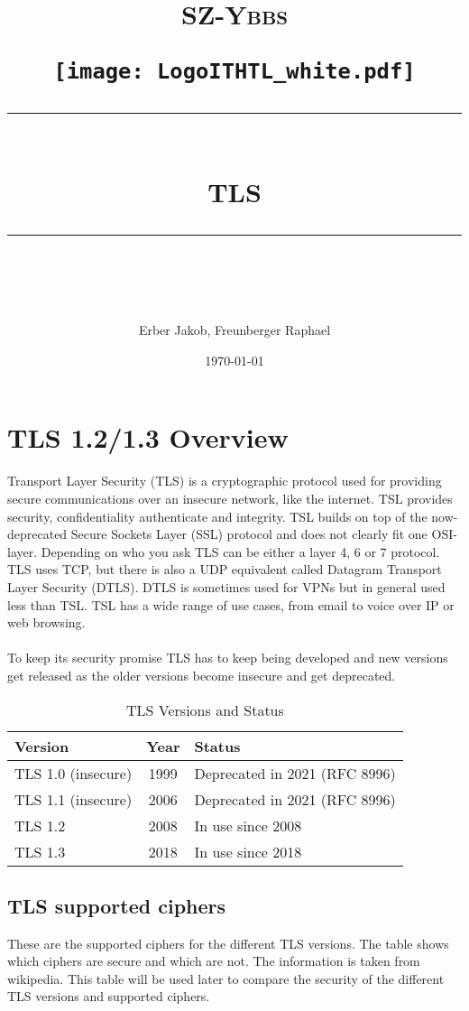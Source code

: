 \documentclass[11pt]{scrartcl} %
\title{	
	\normalfont\normalsize
	\begin{center}
		\begin{minipage}[c]{0.2\textwidth}
			\textsc{\Large SZ-Ybbs}
		\end{minipage}%
		\begin{minipage}[c]{0.1\textwidth}
			\texttt{[image: LogoITHTL\_white.pdf]}
		\end{minipage}
	\end{center}
	\vspace{10pt} %
	\rule{\linewidth}{0.5pt}\\ %
	\vspace{20pt} %
	{\huge TLS}\\ %
	\vspace{12pt} %
	\rule{\linewidth}{2pt}\\ %
	\vspace{12pt} %
}
\author{\LARGE Erber Jakob, Freunberger Raphael} %
\date{\normalsize\today} %
\begin{document}
\maketitle %

\section{TLS 1.2/1.3 Overview}

Transport Layer Security (TLS) is a cryptographic protocol used for providing secure communications over an insecure network, like the internet. TSL provides security, confidentiality authenticate and integrity. TSL builds on top of the now-deprecated Secure Sockets Layer (SSL) protocol and does not clearly fit one OSI-layer. Depending on who you ask TLS can be either a layer 4, 6 or 7 protocol. TLS uses TCP, but there is also a UDP equivalent called Datagram Transport Layer Security (DTLS). DTLS is sometimes used for VPNs but in general used less than TSL. TSL has a wide range of use cases, from email to voice over IP or web browsing.
\\\\
To keep its security promise TLS has to keep being developed and new versions get released as the older versions become insecure and get deprecated.

\begin{table}[h]
    \centering
    \begin{tabular}{|l|c|l|}
        \hline
        \textbf{Version} & \textbf{Year} & \textbf{Status} \\ \hline
        TLS 1.0 (insecure) & 1999 & Deprecated in 2021 (RFC 8996) \\ \hline
        TLS 1.1 (insecure) & 2006 & Deprecated in 2021 (RFC 8996) \\ \hline
        TLS 1.2 & 2008 & In use since 2008 \\ \hline
        TLS 1.3 & 2018 & In use since 2018 \\ \hline
    \end{tabular}
    \caption{TLS Versions and Status}
    \label{tab:tls_versions}
\end{table}

\subsection{TLS supported ciphers}
\label{sec:tls_supported_ciphers}

These are the supported ciphers for the different TLS versions. The table shows which ciphers are secure and which are not. The information is taken from wikipedia. This table will be used later to compare the security of the different TLS versions and supported ciphers.
\end{document}
